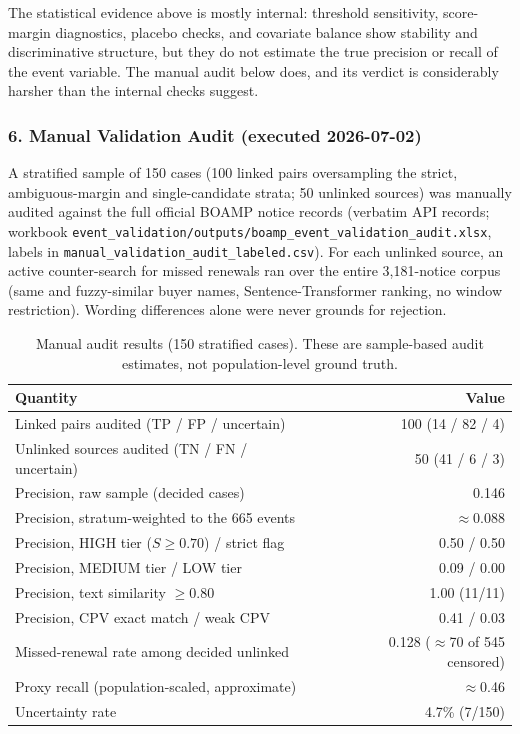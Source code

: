 \documentclass[12pt, a4paper]{article}
\begin{document}
The statistical evidence above is mostly internal: threshold sensitivity,
score-margin diagnostics, placebo checks, and covariate balance show stability
and discriminative structure, but they do not estimate the true precision or
recall of the event variable. The manual audit below does, and its verdict is
considerably harsher than the internal checks suggest.

\subsubsection*{6. Manual Validation Audit (executed 2026-07-02)}
\label{sec:manual_audit}

A stratified sample of 150 cases (100 linked pairs oversampling the strict,
ambiguous-margin and single-candidate strata; 50 unlinked sources) was manually
audited against the full official BOAMP notice records (verbatim API records;
workbook \nolinkurl{event_validation/outputs/boamp_event_validation_audit.xlsx},
labels in \nolinkurl{manual_validation_audit_labeled.csv}). For each unlinked
source, an active counter-search for missed renewals ran over the entire
3,181-notice corpus (same and fuzzy-similar buyer names, Sentence-Transformer
ranking, no window restriction). Wording differences alone were never grounds
for rejection.

\begin{table}[H]
\centering
\caption{Manual audit results (150 stratified cases). These are sample-based
audit estimates, not population-level ground truth.}
\label{tab:manual_audit}
\small
\begin{tabular}{@{}lr@{}}
\toprule
\textbf{Quantity} & \textbf{Value} \\
\midrule
Linked pairs audited (TP / FP / uncertain) & 100 (14 / 82 / 4) \\
Unlinked sources audited (TN / FN / uncertain) & 50 (41 / 6 / 3) \\
Precision, raw sample (decided cases) & 0.146 \\
Precision, stratum-weighted to the 665 events & $\approx$0.088 \\
Precision, HIGH tier ($S \geq 0.70$) / strict flag & 0.50 / 0.50 \\
Precision, MEDIUM tier / LOW tier & 0.09 / 0.00 \\
Precision, text similarity $\geq 0.80$ & 1.00 (11/11) \\
Precision, CPV exact match / weak CPV & 0.41 / 0.03 \\
Missed-renewal rate among decided unlinked & 0.128 ($\approx$70 of 545 censored) \\
Proxy recall (population-scaled, approximate) & $\approx$0.46 \\
Uncertainty rate & 4.7\% (7/150) \\
\bottomrule
\end{tabular}
\end{table}
\end{document}
